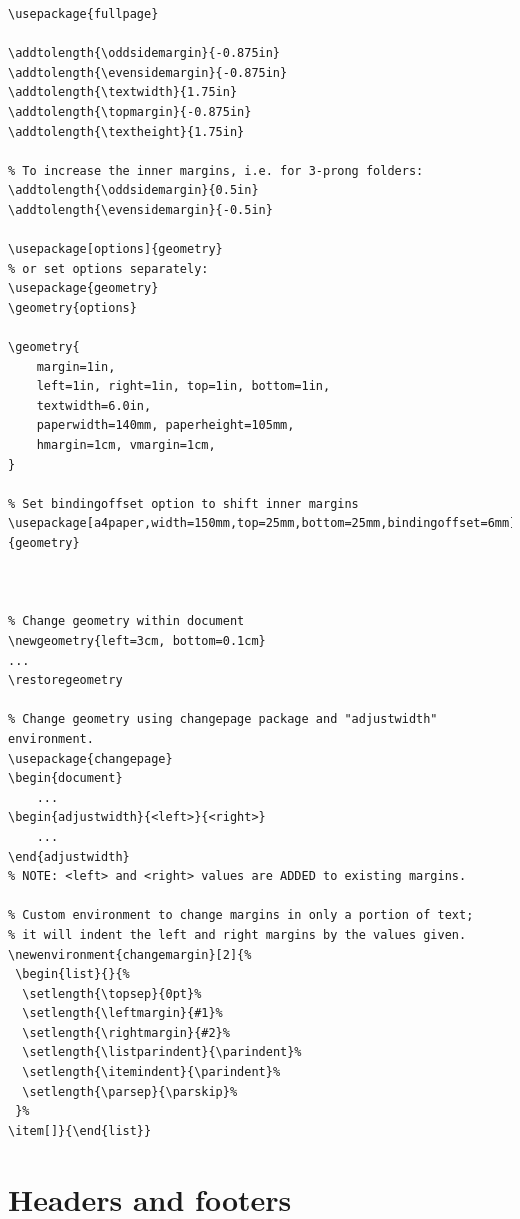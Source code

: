 \documentclass{article}
\begin{document}
\begin{lstlisting}
\usepackage{fullpage}

\addtolength{\oddsidemargin}{-0.875in}
\addtolength{\evensidemargin}{-0.875in}
\addtolength{\textwidth}{1.75in}
\addtolength{\topmargin}{-0.875in}
\addtolength{\textheight}{1.75in}

% To increase the inner margins, i.e. for 3-prong folders:
\addtolength{\oddsidemargin}{0.5in}
\addtolength{\evensidemargin}{-0.5in}

\usepackage[options]{geometry}
% or set options separately:
\usepackage{geometry}
\geometry{options}

\geometry{
    margin=1in,
    left=1in, right=1in, top=1in, bottom=1in,
    textwidth=6.0in,
    paperwidth=140mm, paperheight=105mm,
    hmargin=1cm, vmargin=1cm,
}

% Set bindingoffset option to shift inner margins
\usepackage[a4paper,width=150mm,top=25mm,bottom=25mm,bindingoffset=6mm]{geometry}



% Change geometry within document
\newgeometry{left=3cm, bottom=0.1cm}
...
\restoregeometry

% Change geometry using changepage package and "adjustwidth" environment.
\usepackage{changepage}
\begin{document}
    ...
\begin{adjustwidth}{<left>}{<right>}
    ...
\end{adjustwidth}
% NOTE: <left> and <right> values are ADDED to existing margins.

% Custom environment to change margins in only a portion of text;
% it will indent the left and right margins by the values given.
\newenvironment{changemargin}[2]{%
 \begin{list}{}{%
  \setlength{\topsep}{0pt}%
  \setlength{\leftmargin}{#1}%
  \setlength{\rightmargin}{#2}%
  \setlength{\listparindent}{\parindent}%
  \setlength{\itemindent}{\parindent}%
  \setlength{\parsep}{\parskip}%
 }%
\item[]}{\end{list}}
\end{lstlisting}



\clearpage

\section{Headers and footers}\label{headfoot}
\end{document}
